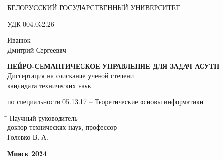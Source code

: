 \begin{titlepage}

\begin{center} \bfseries
\bigskip
\medskip

{БЕЛОРУССКИЙ ГОСУДАРСТВЕННЫЙ УНИВЕРСИТЕТ}
\end{center}
\vspace{1cm}

\noindent УДК 004.032.26 \\
\vspace{1cm}

\begin{center}
{Иванюк \\ Дмитрий Сергеевич}\\ \vspace{1cm}

{\bfseries НЕЙРО-СЕМАНТИЧЕСКОЕ УПРАВЛЕНИЕ ДЛЯ ЗАДАЧ АСУТП}\\
\vspace{2cm}
Диссертация на соискание ученой степени\\
кандидата технических наук\\
\bigskip

по специальности 05.13.17 -- Теоретические основы информатики
\end{center}
\vspace{3cm}

\begin{tabbing}
\hspace{8cm} \= \kill \>
Научный руководитель \+ \\
доктор технических наук, профессор\\
Головко В. А.
\end{tabbing}
\vspace{7cm}

\begin{center}
 \bfseries Минск 2024
\end{center}

\end{titlepage}
